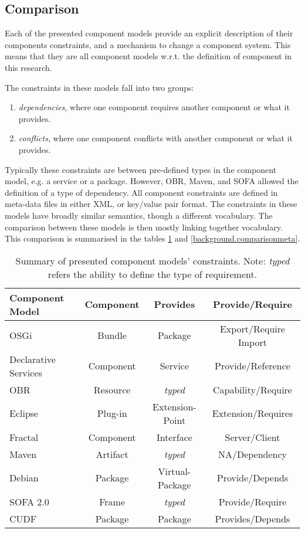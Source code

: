 \subsection{Comparison}
Each of the presented component models provide an explicit description of their components constraints, and a mechanism to change a component system.
This means that they are all component models w.r.t. the definition of component in this research.

The constraints in these models fall into two groups:
\begin{enumerate}
  \item \textit{dependencies}, where one component requires another component or what it provides.
  \item \textit{conflicts}, where one component conflicts with another component or what it provides. 
\end{enumerate} 
Typically these constraints are between pre-defined types in the component model, e.g. a service or a package.
However, OBR, Maven, and SOFA allowed the definition of a type of dependency. 
All component constraints are defined in meta-data files in either XML, or key/value pair format.
The constraints in these models have broadly similar semantics, though a different vocabulary.
The comparison between these models is then mostly linking together vocabulary.
This comparison is summarised in the tables  \ref{background.comparisonrel} and \ref{background.comparisonmeta}.  

\begin{table}[h!]
\begin{tabular}{|l || c | c | c | }
\hline \textbf{Component Model}& \textbf{Component}& \textbf{Provides}	& \textbf{Provide/Require}\\ \hline

OSGi					& Bundle			& Package 					& Export/Require Import \\
Declarative Services	& Component			& Service 					& Provide/Reference\\
OBR						& Resource			& \textit{typed}			& Capability/Require\\
Eclipse					& Plug-in			& Extension-Point			& Extension/Requires\\
Fractal					& Component			& Interface 				& Server/Client\\
Maven					& Artifact			& \textit{typed} 			& NA/Dependency\\
Debian					& Package			& Virtual-Package 			& Provide/Depends\\
SOFA 2.0				& Frame				& \textit{typed} 			& Provide/Require\\
CUDF					& Package			& Package 					& Provides/Depends\\\hline
\end{tabular}
\caption[Summary of presented component models' constraints.]{Summary of presented component models' constraints. Note: \textit{typed} refers the ability to define the type of requirement.}
\label{background.comparisonrel}
\end{table}


